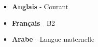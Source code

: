 \documentclass[9pt]{developercv} %
\begin{document}




\vspace{-10 pt}
\vspace{-6pt}

\begin{itemize}[noitemsep,topsep=0pt,parsep=0pt,partopsep=0pt, leftmargin=0.18\textwidth]
    \item \textbf{Anglais} - Courant
    \item \textbf{Français} - B2
    \item \textbf{Arabe} - Langue maternelle
\end{itemize}


\end{document}
